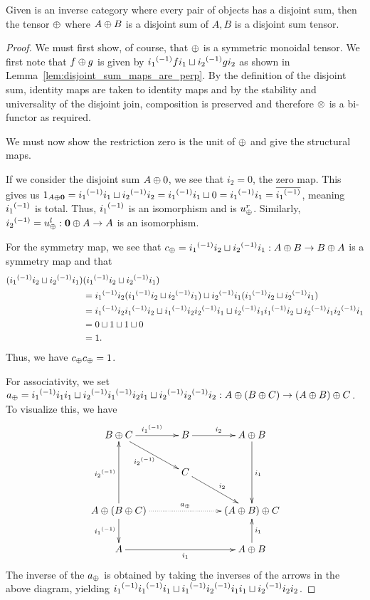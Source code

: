 \begin{proposition}\label{prop:enough_disjoint_sums_make_a_disjoint_sum_tensor}
  Given \X is an inverse category where every pair of objects has a disjoint sum, then the tensor
  $\oplus$ where $A\oplus B$ is a disjoint sum of $A,B$ is a disjoint sum tensor.
\end{proposition}
\begin{proof}
  We must first show, of course, that $\oplus$ is a symmetric monoidal tensor. We first note that $f\oplus g$ is
  given by   ${i_1}^{(-1)} f i_1 \sqcup {i_2}^{(-1)} g i_2$ as shown in
  Lemma~\ref{lem:disjoint_sum_maps_are_perp}. By the definition of the disjoint sum, identity maps
  are taken to identity maps and by the stability and universality of the disjoint join, composition
  is preserved and therefore $\otimes$ is a bi-functor as required.

  We must now show the restriction zero is the unit of $\oplus$ and give the structural maps.

  If we consider the disjoint sum $A\oplus0$, we see that $i_2 = 0$, the zero map. This gives us
  $1_{A\oplus\mathbf{0}}  = {i_1}^{(-1)}i_1 \sqcup {i_2}^{(-1)}i_2 = {i_1}^{(-1)}i_1 \sqcup 0 = {i_1}^{(-1)}i_1 =
    \overline{{i_1}^{(-1)}}$, meaning ${i_1}^{(-1)}$ is total. Thus, ${i_1}^{(-1)}$ is an isomorphism and is
  $u_{\oplus}^r$. Similarly, ${i_2}^{(-1)} = u_{\oplus}^l:\mathbf{0}\oplus A \to A$ is an isomorphism.

  For the symmetry map, we see that $c_\oplus = {i_1}^{(-1)}i_2 \sqcup {i_2}^{(-1)}i_1: A\oplus B \to B\oplus A$ is a symmetry
  map and that
  \begin{align*}
    ({i_1}^{(-1)}i_2 \sqcup {i_2}^{(-1)}i_1)&({i_1}^{(-1)}i_2 \sqcup {i_2}^{(-1)}i_1)\\
    &={i_1}^{(-1)}i_2({i_1}^{(-1)}i_2
    \sqcup {i_2}^{(-1)}i_1) \sqcup {i_2}^{(-1)}i_1({i_1}^{(-1)}i_2 \sqcup {i_2}^{(-1)}i_1)\\
    &={i_1}^{(-1)}i_2{i_1}^{(-1)}i_2 \sqcup {i_1}^{(-1)}i_2{i_2}^{(-1)}i_1 \sqcup {i_2}^{(-1)}i_1{i_1}^{(-1)}i_2
    \sqcup {i_2}^{(-1)}i_1{i_2}^{(-1)}i_1\\
    & = 0 \sqcup 1 \sqcup 1 \sqcup 0 \\
    & = 1.
  \end{align*}
  Thus, we have $c_\oplus c_\oplus =1$.

  For associativity, we set $a_\oplus = {i_1}^{(-1)}i_1i_1 \sqcup {i_2}^{(-1)}{i_1}^{(-1)}i_2i_1 \sqcup {i_2}^{(-1)}
  {i_2}^{(-1)} i_2:A\oplus(B\oplus C) \to (A\oplus B)\oplus C$.
  To visualize this, we have
  \[
    \xymatrix@C+5pt{
      B\+C \ar[r]^{\inv{i_1}} \ar[dr]_{\inv{i_2}}
        & B \ar[r]^{i_2}
        & A\+B \ar[dd]^{i_1}\\
      & C \ar[dr]^{i_2} & \\
      A\+(B\+C)\ar[uu]^{\inv{i_2}} \ar[d]_{\inv{i_1}} \ar@{.>}[rr]^{a_{\+}} && (A\+B)\+C \\
      A \ar[rr]_{i_1} & & A\+B \ar[u]_{i_1}
    }
  \]
  The inverse of the $a_\oplus$ is obtained by taking the inverses of the arrows in the above diagram,
  yielding ${i_1}^{(-1)}{i_1}^{(-1)}i_1 \sqcup {i_1}^{(-1)}{i_2}^{(-1)}i_1i_1 \sqcup {i_2}^{(-1)}i_2 i_2$.


\end{proof}

